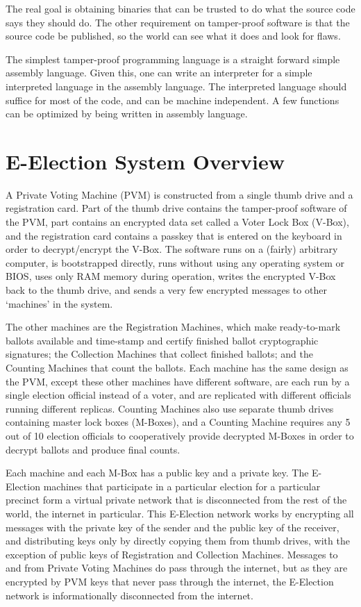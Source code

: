 \documentclass[12pt]{article}
\begin{document}
The real goal is obtaining binaries that can be trusted to
do what the source code says they should do.  The other
requirement on tamper-proof software is that the source code
be published, so the world can see what it does and look
for flaws.

The simplest tamper-proof programming language is a straight
forward simple assembly language.  Given this, one can write
an interpreter for a simple interpreted language in the
assembly language.  The interpreted language should suffice
for most of the code, and can be machine independent.
A few functions can be optimized by being written in assembly
language.

\section{E-Election System Overview}

A Private Voting Machine
(PVM) is constructed from a single thumb drive and a
registration card.  Part of the thumb drive contains the
tamper-proof software of the PVM, part contains an encrypted
data set called a Voter Lock Box (V-Box), and the registration
card contains a passkey that is entered on the keyboard in
order to decrypt/encrypt the V-Box.  The software runs on
a (fairly) arbitrary computer, is bootstrapped directly,
runs without using any operating system or BIOS,
uses only RAM memory during operation,
writes the encrypted V-Box back to the thumb drive, and sends
a very few encrypted messages to other `machines' in the
system.

The other machines are the Registration Machines, which make
ready-to-mark ballots available and time-stamp and certify
finished ballot cryptographic signatures;
the Collection Machines that collect
finished ballots; and the Counting Machines that count the
ballots.  Each machine has the same design as the PVM, except
these other machines have different software,
are each run by a single election official instead of a voter, and
are replicated with different officials running different
replicas.  Counting Machines also use separate
thumb drives containing master lock boxes
(M-Boxes), and a Counting Machine requires
any 5 out of 10 election officials to cooperatively
provide decrypted M-Boxes in order to decrypt ballots and
produce final counts.

Each machine and each M-Box has a public key and a private key.
The E-Election machines that participate in
a particular election for a particular
precinct form a virtual private network that is disconnected from
the rest of the world, the internet in particular.  This E-Election
network works by encrypting all messages with the private key of the
sender and the public key of the receiver, and distributing
keys only by directly copying them from
thumb drives, with the exception of public keys of Registration and
Collection Machines.  Messages to and from Private Voting Machines do pass
through the internet, but as they are encrypted by PVM keys that never
pass through the internet, the E-Election network is informationally
disconnected from the internet.
\end{document}
